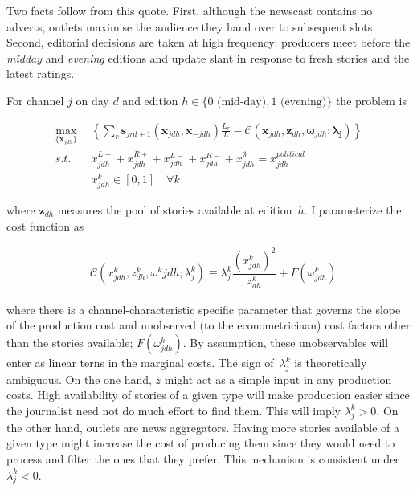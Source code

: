 \documentclass[12pt]{article}
\begin{document}
Two facts follow from this quote. First, although the newscast contains no adverts, outlets maximise the audience they hand over to subsequent slots. Second, editorial decisions are taken at high frequency: producers meet before the \emph{midday} and \emph{evening} editions and update slant in response to fresh stories and the latest ratings.


For channel $j$ on day $d$ and edition $h\in\{0\text{ (mid-day)},1\text{ (evening)}\}$ the problem is



\begin{equation}\label{eq:payoffs}
	\begin{aligned}
		\max_{\{\mathbf{x}_{jdh}\}}   & \left\{   \sum_{r}\bm{s}_{jrd+1}(\bm{x}_{jdh}, \bm{x}_{-jdh})\frac{L_r}{L} -  \mathcal{C}\left(  \bm{x}_{jdh},\bm{z}_{dh}, \bm{\omega}_{jdh}; \bm{\lambda_j}   \right)    \right\}\\
		s.t.   \quad &   x_{jdh}^{L+} +x_{jdh}^{R+} + x_{jdh}^{L-} + x_{jdh}^{R-} + x_{jdh}^{\emptyset} = x_{jdh}^{political}\\
		& x_{jdh}^k \in [0,1] \quad \forall k
	\end{aligned}
\end{equation} 






where $\bm z_{dh}$ measures the pool of stories available at edition~$h$.  
I parameterize the cost function as

\begin{equation*}\label{}
	\begin{aligned}
		& \mathcal{C}(x_{jdh}^k,z_{dh}^k,\omega^k{jdh}; \lambda_j^k )\equiv   \lambda_j^k  \dfrac{(x_{jdh}^k)^2}{z_{dh}^k} + F(\omega^k_{jdh})
	\end{aligned}
\end{equation*} 

where there is a channel-characteristic specific parameter that governs the slope of the production cost and unobserved (to the econometriciaan) cost factors other than the stories available; $ F(\omega^k_{jdh})$. By assumption, these unobservables will enter as linear terns in the marginal costs. The sign of~$\lambda_j^k$
is theoretically ambiguous. On the one hand, $z$ might act as a simple input in any production costs. High availability of stories of a given type will make production easier since the journalist need not do much effort to find them. This will imply $ \lambda_j^k>0$. On the other hand, outlets are news aggregators. Having more stories available of a given type might increase the cost of producing them since they would need to process and filter the ones that they prefer. This mechanism is consistent under $ \lambda_j^k<0$.
\end{document}

